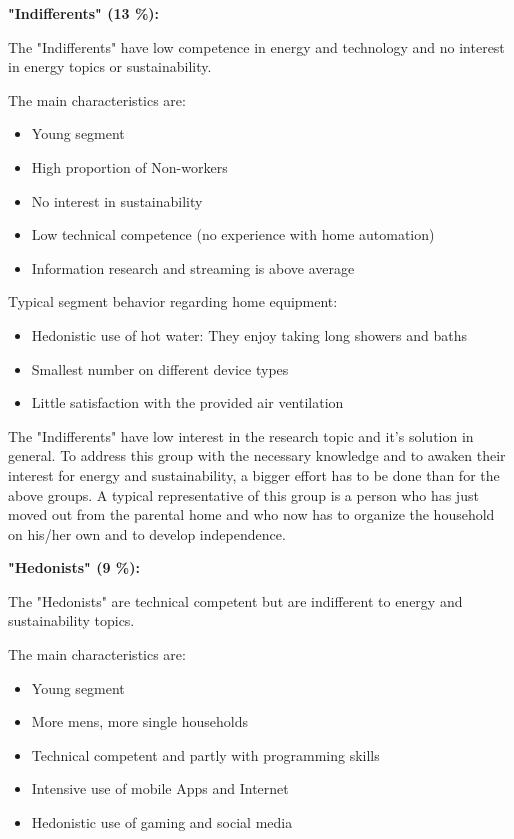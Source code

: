 \textbf{"Indifferents" (13 \%):}

The "Indifferents" have low competence in energy and technology and no interest in energy topics or sustainability.

The main characteristics are:
\begin{itemize}
	\item Young segment
	\item High proportion of Non-workers
	\item No interest in sustainability
	\item Low technical competence (no experience with home automation)
	\item Information research and streaming is above average
\end{itemize}

Typical segment behavior regarding home equipment:
\begin{itemize}
	\item Hedonistic use of hot water: They enjoy taking long showers and baths
	\item Smallest number on different device types
	\item Little satisfaction with the provided air ventilation
\end{itemize}

The "Indifferents" have low interest in the research topic and it's solution in general. To address this group with the necessary knowledge and to awaken their interest for energy and sustainability, a bigger effort has to be done than for the above groups. A typical representative of this group is a person who has just moved out from the parental home and who now has to organize the household on his/her own and to develop independence.

\textbf{"Hedonists" (9 \%):}

The "Hedonists" are technical competent but are indifferent to energy and sustainability topics.

The main characteristics are:
\begin{itemize}
	\item Young segment
	\item More mens, more single households
	\item Technical competent and partly with programming skills
	\item Intensive use of mobile Apps and Internet
	\item Hedonistic use of gaming and social media
\end{itemize}

